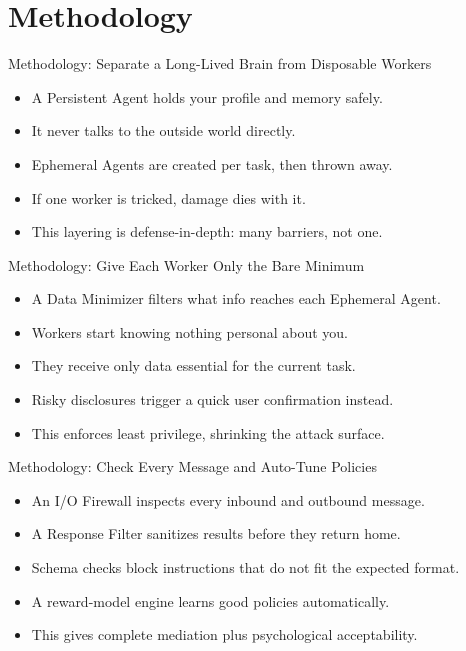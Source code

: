 \documentclass[10pt]{beamer}
\begin{document}
\section{Methodology}
\begin{frame}[allowframebreaks]{Methodology: Separate a Long-Lived Brain from Disposable Workers}
\begin{itemize}
  \item A Persistent Agent holds your profile and memory safely.
  \item It never talks to the outside world directly.
  \item Ephemeral Agents are created per task, then thrown away.
  \item If one worker is tricked, damage dies with it.
  \item This layering is defense-in-depth: many barriers, not one.
\end{itemize}
\end{frame}
\begin{frame}[allowframebreaks]{Methodology: Give Each Worker Only the Bare Minimum}
\begin{itemize}
  \item A Data Minimizer filters what info reaches each Ephemeral Agent.
  \item Workers start knowing nothing personal about you.
  \item They receive only data essential for the current task.
  \item Risky disclosures trigger a quick user confirmation instead.
  \item This enforces least privilege, shrinking the attack surface.
\end{itemize}
\end{frame}
\begin{frame}[allowframebreaks]{Methodology: Check Every Message and Auto-Tune Policies}
\begin{itemize}
  \item An I/O Firewall inspects every inbound and outbound message.
  \item A Response Filter sanitizes results before they return home.
  \item Schema checks block instructions that do not fit the expected format.
  \item A reward-model engine learns good policies automatically.
  \item This gives complete mediation plus psychological acceptability.
\end{itemize}
\end{frame}
\end{document}
